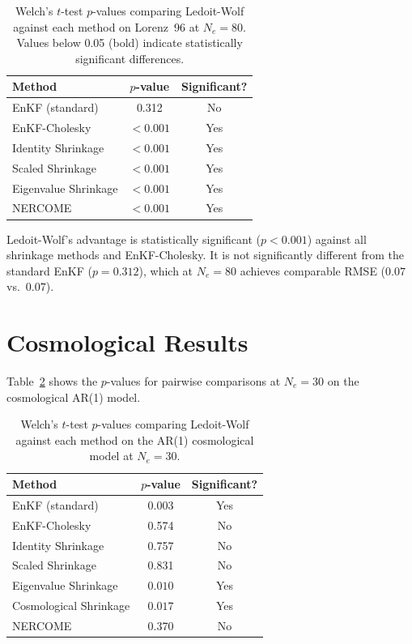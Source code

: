 \begin{table}[htbp]
\centering
\caption{Welch's $t$-test $p$-values comparing Ledoit-Wolf against each method on Lorenz~96 at $N_e = 80$. Values below 0.05 (bold) indicate statistically significant differences.}
\label{tab:app_sig_lorenz}
\begin{tabular}{@{}lcc@{}}
\toprule
Method & $p$-value & Significant? \\
\midrule
EnKF (standard)          & 0.312 & No \\
EnKF-Cholesky            & $\mathbf{< 0.001}$ & Yes \\
Identity Shrinkage       & $\mathbf{< 0.001}$ & Yes \\
Scaled Shrinkage         & $\mathbf{< 0.001}$ & Yes \\
Eigenvalue Shrinkage     & $\mathbf{< 0.001}$ & Yes \\
NERCOME                  & $\mathbf{< 0.001}$ & Yes \\
\bottomrule
\end{tabular}
\end{table}

Ledoit-Wolf's advantage is statistically significant ($p < 0.001$) against all shrinkage methods and EnKF-Cholesky. It is not significantly different from the standard EnKF ($p = 0.312$), which at $N_e = 80$ achieves comparable RMSE ($0.07$ vs.\ $0.07$).

\section{Cosmological Results}

Table~\ref{tab:app_sig_cosmo} shows the $p$-values for pairwise comparisons at $N_e = 30$ on the cosmological AR(1) model.

\begin{table}[htbp]
\centering
\caption{Welch's $t$-test $p$-values comparing Ledoit-Wolf against each method on the AR(1) cosmological model at $N_e = 30$.}
\label{tab:app_sig_cosmo}
\begin{tabular}{@{}lcc@{}}
\toprule
Method & $p$-value & Significant? \\
\midrule
EnKF (standard)          & $\mathbf{0.003}$ & Yes \\
EnKF-Cholesky            & 0.574 & No \\
Identity Shrinkage       & 0.757 & No \\
Scaled Shrinkage         & 0.831 & No \\
Eigenvalue Shrinkage     & $\mathbf{0.010}$ & Yes \\
Cosmological Shrinkage   & $\mathbf{0.017}$ & Yes \\
NERCOME                  & 0.370 & No \\
\bottomrule
\end{tabular}
\end{table}

